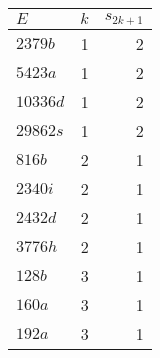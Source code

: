 \documentclass[11pt]{article}
\theoremstyle{plain}
\theoremstyle{definition}
\numberwithin{equation}{section}
\numberwithin{figure}{section}
\numberwithin{table}{section}
\begin{document}
\hskip160pt\begin{tabular} {l | r r}\hline
$E$ & $k$ & $s_{2k+1}$\\
\hline\hline
$2379b$ & 1 & 2 \\
\hline
$5423a$ &  1 & 2   \\
\hline
$10336d$ &  1 & 2  \\
\hline
$29862s$ &  1 & 2  \\
\hline
$816b$ &  2 & 1  \\
\hline
$2340i$ &  2 & 1  \\
\hline
$2432d$ &  2 & 1  \\
\hline
$3776h$ &  2 & 1  \\
\hline
$128b$ &  3 & 1  \\
\hline
$160a$ &  3 & 1  \\
\hline
$192a$ & 3 & 1  \\
\hline
\end{tabular}

\vskip40pt


\vskip10pt
\end{document}
